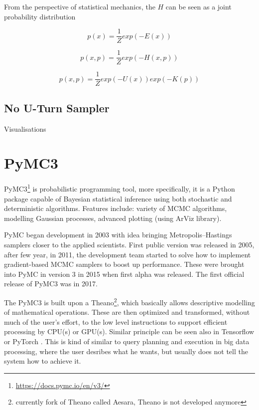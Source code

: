 \documentclass[
  digital, %
  oneside, %
  lof,     %
  lot,     %
]{fithesis4}
\begin{document}
From the perspective of statistical mechanics, the $H$ can be seen
as a joint probability distribution

\begin{equation}
  p(x) = \frac{1}{Z} exp \left( -E(x) \right)
\end{equation}

\begin{equation}
  p(x, p) = \frac{1}{Z} exp \left( -H(x, p) \right)
\end{equation}

\begin{equation}
  p(x, p) = \frac{1}{Z} exp \left( -U(x) \right) exp \left( -K(p) \right)
\end{equation}

\subsection{No U-Turn Sampler}
\label{sec:nuts}

Visualisations \cite{mcelreath2017}

\section{PyMC3}

PyMC3\footnote{\url{https://docs.pymc.io/en/v3/}} 
is probabilistic programming tool, more specifically, 
it is a Python package capable of Bayesian statistical 
inference using both stochastic and deterministic algorithms. 
Features include: variety of MCMC algorithms,
modelling Gaussian processes, advanced plotting
(using ArViz library).

PyMC began development in 2003 with idea
bringing Metropolis–Hastings samplers closer to 
the applied scientists.
First public version was released in 2005,
after few year, in 2011, the development team
started to solve how to implement gradient-based MCMC samplers
to boost up performance.
These were brought into PyMC in version 3
in 2015 when first alpha was released.
The first official release of PyMC3 was in 2017.

The PyMC3 is built upon a Theano\footnote{currently fork of 
Theano called Aesara, Theano is not developed anymore},
which basically allows descriptive modelling 
of mathematical operations.
These are then optimized and transformed,
without much of the user's effort, to 
the low level instructions to support efficient 
processing by CPU(s) or GPU(s).
Similar principle can be seen also in Tensorflow 
\cite{tf} or PyTorch \cite{pytorch}.
This is kind of similar to query planning and execution
in big data processing, where the user desribes what
he wants, but usually does not tell the system how 
to achieve it.
\end{document}
